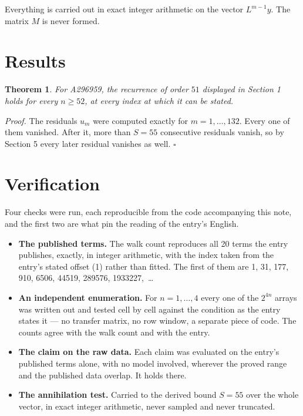 \documentclass[11pt]{article}
\newtheorem{theorem}{Theorem}
\theoremstyle{definition}
\begin{document}
Everything is carried out in exact integer arithmetic on the vector $L^{m-1}y$. The matrix $M$ is never formed.

\section{Results}

\begin{theorem} For A296959, the recurrence of order $51$ displayed in Section 1 holds for every $n \ge 52$, at every index at which it can be stated.\end{theorem}

{\itshape Proof.} The residuals $u_m$ were computed exactly for $m = 1,\dots,132$. Every one of them vanished. After it, more than $S = 55$ consecutive residuals vanish, so by Section 5 every later residual vanishes as well. $\square$

\section{Verification}

Four checks were run, each reproducible from the code accompanying this note, and the first two are what pin the reading of the entry's English.

\begin{itemize}

\item {\bfseries The published terms.} The walk count reproduces all 20 terms the entry publishes, exactly, in integer arithmetic, with the index taken from the entry's stated offset (1) rather than fitted. The first of them are 1, 31, 177, 910, 6506, 44519, 289576, 1933227,~\dots

\item {\bfseries An independent enumeration.} For $n = 1,\dots,4$ every one of the $2^{4n}$ arrays was written out and tested cell by cell against the condition as the entry states it --- no transfer matrix, no row window, a separate piece of code. The counts agree with the walk count and with the entry.

\item {\bfseries The claim on the raw data.} Each claim was evaluated on the entry's published terms alone, with no model involved, wherever the proved range and the published data overlap. It holds there.

\item {\bfseries The annihilation test.} Carried to the derived bound $S = 55$ over the whole vector, in exact integer arithmetic, never sampled and never truncated.

\end{itemize}
\end{document}

